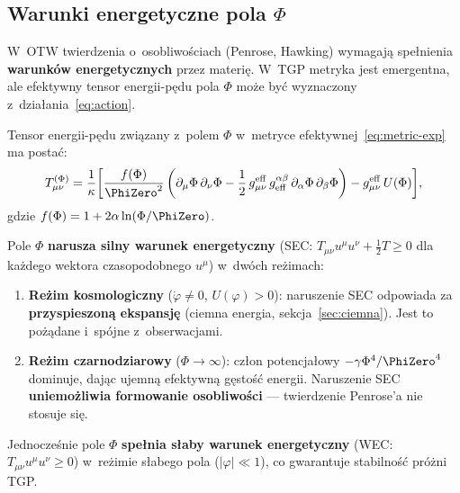 \subsection{Warunki energetyczne pola $\Phi$}\label{ssec:warunki-energ}

W~OTW twierdzenia o~osobliwo\'sciach (Penrose, Hawking) wymagaj\k{a}
spe\l{}nienia \textbf{warunk\'ow energetycznych} przez materi\k{e}.
W~TGP metryka jest emergentna, ale efektywny tensor energii-p\k{e}du
pola $\Phi$ mo\.ze by\'c wyznaczony z~dzia\l{}ania~\eqref{eq:action}.

\begin{proposition}\label{prop:T-Phi}
Tensor energii-p\k{e}du zwi\k{a}zany z~polem $\Phi$ w~metryce
efektywnej~\eqref{eq:metric-exp} ma posta\'c:
\begin{equation}\label{eq:T-Phi}
    T_{\mu\nu}^{(\Phi)} = \frac{1}{\kappa}\biggl[
      \frac{f(\Phi)}{\PhiZero^2}\left(
        \partial_\mu\Phi\,\partial_\nu\Phi
        - \frac{1}{2}\,g_{\mu\nu}^{\mathrm{eff}}\,
          g_{\mathrm{eff}}^{\alpha\beta}\,
          \partial_\alpha\Phi\,\partial_\beta\Phi
      \right)
      - g_{\mu\nu}^{\mathrm{eff}}\,U(\Phi)
    \biggr],
\end{equation}
gdzie $f(\Phi) = 1 + 2\alpha\ln(\Phi/\PhiZero)$.
\end{proposition}

\begin{proposition}\label{prop:SEC-violation}
Pole $\Phi$ \textbf{narusza silny warunek energetyczny}
(SEC: $T_{\mu\nu}u^\mu u^\nu + \frac{1}{2}T \geq 0$
dla ka\.zdego wektora czasopodobnego $u^\mu$)
w~dw\'och re\.zimach:
\begin{enumerate}[nosep]
  \item \textbf{Re\.zim kosmologiczny} ($\dot\varphi \neq 0$,
    $U(\varphi) > 0$): naruszenie SEC odpowiada za
    \textbf{przyspieszon\k{a} ekspansj\k{e}} (ciemna energia,
    sekcja~\ref{sec:ciemna}). Jest to po\.z\k{a}dane i~sp\'ojne
    z~obserwacjami.
  \item \textbf{Re\.zim czarnodziarowy} ($\Phi \to \infty$):
    cz\l{}on potencja\l{}owy $-\gamma\Phi^4/\PhiZero^4$
    dominuje, daj\k{a}c ujemn\k{a} efektywn\k{a} g\k{e}sto\'s\'c
    energii. Naruszenie SEC \textbf{uniemo\.zliwia formowanie
    osobliwo\'sci} --- twierdzenie Penrose'a nie stosuje si\k{e}.
\end{enumerate}
Jednocze\'snie pole $\Phi$ \textbf{spe\l{}nia s\l{}aby warunek
energetyczny} (WEC: $T_{\mu\nu}u^\mu u^\nu \geq 0$)
w~re\.zimie s\l{}abego pola ($|\varphi| \ll 1$),
co gwarantuje stabilno\'s\'c pr\'o\.zni TGP.
\end{proposition}

